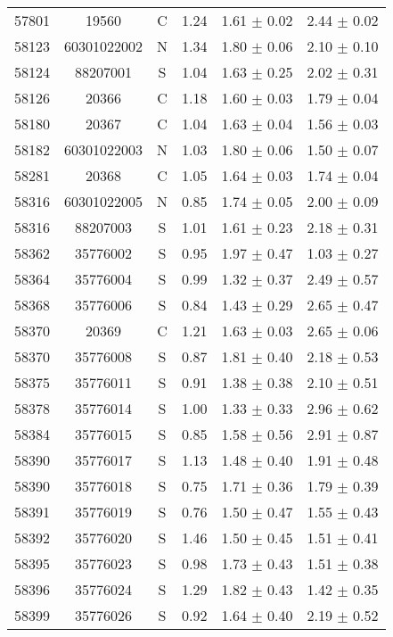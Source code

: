 \begin{table*}
\begin{tabular}{lccccc}
     57801 & 19560 & C & 1.24 & 1.61 $\pm$ 0.02 & 2.44 $\pm$ 0.02  \\
     58123 & 60301022002 & N & 1.34 & 1.80 $\pm$ 0.06 & 2.10 $\pm$ 0.10  \\
     58124 & 88207001 & S & 1.04 & 1.63 $\pm$ 0.25 & 2.02 $\pm$ 0.31  \\
     58126 & 20366 & C & 1.18 & 1.60 $\pm$ 0.03 & 1.79 $\pm$ 0.04  \\
     58180 & 20367 & C & 1.04 & 1.63 $\pm$ 0.04 & 1.56 $\pm$ 0.03  \\
     58182 & 60301022003 & N & 1.03 & 1.80 $\pm$ 0.06 & 1.50 $\pm$ 0.07  \\
     58281 & 20368 & C & 1.05 & 1.64 $\pm$ 0.03 & 1.74 $\pm$ 0.04  \\
     58316 & 60301022005 & N & 0.85 & 1.74 $\pm$ 0.05 & 2.00 $\pm$ 0.09  \\
     58316 & 88207003 & S & 1.01 & 1.61 $\pm$ 0.23 & 2.18 $\pm$ 0.31  \\
     58362 & 35776002 & S & 0.95 & 1.97 $\pm$ 0.47 & 1.03 $\pm$ 0.27  \\
     58364 & 35776004 & S & 0.99 & 1.32 $\pm$ 0.37 & 2.49 $\pm$ 0.57  \\
     58368 & 35776006 & S & 0.84 & 1.43 $\pm$ 0.29 & 2.65 $\pm$ 0.47  \\
     58370 & 20369 & C & 1.21 & 1.63 $\pm$ 0.03 & 2.65 $\pm$ 0.06  \\
     58370 & 35776008 & S & 0.87 & 1.81 $\pm$ 0.40 & 2.18 $\pm$ 0.53  \\
     58375 & 35776011 & S & 0.91 & 1.38 $\pm$ 0.38 & 2.10 $\pm$ 0.51  \\
     58378 & 35776014 & S & 1.00 & 1.33 $\pm$ 0.33 & 2.96 $\pm$ 0.62  \\
     58384 & 35776015 & S & 0.85 & 1.58 $\pm$ 0.56 & 2.91 $\pm$ 0.87  \\
     58390 & 35776017 & S & 1.13 & 1.48 $\pm$ 0.40 & 1.91 $\pm$ 0.48  \\
     58390 & 35776018 & S & 0.75 & 1.71 $\pm$ 0.36 & 1.79 $\pm$ 0.39  \\
     58391 & 35776019 & S & 0.76 & 1.50 $\pm$ 0.47 & 1.55 $\pm$ 0.43  \\
     58392 & 35776020 & S & 1.46 & 1.50 $\pm$ 0.45 & 1.51 $\pm$ 0.41  \\
     58395 & 35776023 & S & 0.98 & 1.73 $\pm$ 0.43 & 1.51 $\pm$ 0.38  \\
     58396 & 35776024 & S & 1.29 & 1.82 $\pm$ 0.43 & 1.42 $\pm$ 0.35  \\
     58399 & 35776026 & S & 0.92 & 1.64 $\pm$ 0.40 & 2.19 $\pm$ 0.52  \\

\end{tabular}
\end{table*}
